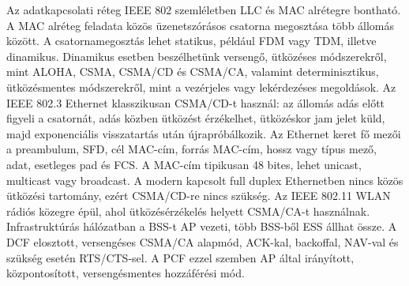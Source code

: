 \begin{summarybox}
Az adatkapcsolati réteg IEEE 802 szemléletben LLC és MAC alrétegre bontható. A MAC alréteg feladata közös üzenetszórásos csatorna megosztása több állomás között. A csatornamegosztás lehet statikus, például FDM vagy TDM, illetve dinamikus. Dinamikus esetben beszélhetünk versengő, ütközéses módszerekről, mint ALOHA, CSMA, CSMA/CD és CSMA/CA, valamint determinisztikus, ütközésmentes módszerekről, mint a vezérjeles vagy lekérdezéses megoldások. Az IEEE 802.3 Ethernet klasszikusan CSMA/CD-t használ: az állomás adás előtt figyeli a csatornát, adás közben ütközést érzékelhet, ütközéskor jam jelet küld, majd exponenciális visszatartás után újrapróbálkozik. Az Ethernet keret fő mezői a preambulum, SFD, cél MAC-cím, forrás MAC-cím, hossz vagy típus mező, adat, esetleges pad és FCS. A MAC-cím tipikusan 48 bites, lehet unicast, multicast vagy broadcast. A modern kapcsolt full duplex Ethernetben nincs közös ütközési tartomány, ezért CSMA/CD-re nincs szükség. Az IEEE 802.11 WLAN rádiós közegre épül, ahol ütközésérzékelés helyett CSMA/CA-t használnak. Infrastruktúrás hálózatban a BSS-t AP vezeti, több BSS-ből ESS állhat össze. A DCF elosztott, versengéses CSMA/CA alapmód, ACK-kal, backoffal, NAV-val és szükség esetén RTS/CTS-sel. A PCF ezzel szemben AP által irányított, központosított, versengésmentes hozzáférési mód.
\end{summarybox}
